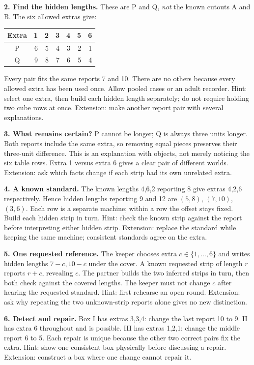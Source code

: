 \documentclass[letterpaper,11pt]{article}
\begin{document}
\textbf{2. Find the hidden lengths.} These are P and Q, \emph{not} the known cutouts A and B. The six allowed extras give:
\begin{center}\begin{tabular}{c|rrrrrr}
Extra&1&2&3&4&5&6\\\hline
P&6&5&4&3&2&1\\
Q&9&8&7&6&5&4
\end{tabular}\end{center}
Every pair fits the same reports 7 and 10. There are no others because every allowed extra has been used once. Allow pooled cases or an adult recorder. Hint: select one extra, then build each hidden length separately; do not require holding two cube rows at once. Extension: make another report pair with several explanations.

\textbf{3. What remains certain?} P cannot be longer; Q is always three units longer. Both reports include the same extra, so removing equal pieces preserves their three-unit difference. This is an explanation with objects, not merely noticing the six table rows. Extra 1 versus extra 6 gives a clear pair of different worlds. Extension: ask which facts change if each strip had its own unrelated extra.

\textbf{4. A known standard.} The known lengths 4,6,2 reporting 8 give extras 4,2,6 respectively. Hence hidden lengths reporting 9 and 12 are $(5,8)$, $(7,10)$, $(3,6)$. Each row is a separate machine; within a row the offset stays fixed. Build each hidden strip in turn. Hint: check the known strip against the report before interpreting either hidden strip. Extension: replace the standard while keeping the same machine; consistent standards agree on the extra.

\textbf{5. One requested reference.} The keeper chooses extra $c\in\{1,\ldots,6\}$ and writes hidden lengths $7-c,10-c$ under the cover. A known requested strip of length $r$ reports $r+c$, revealing $c$. The partner builds the two inferred strips in turn, then both check against the covered lengths. The keeper must not change $c$ after hearing the requested standard. Hint: first rehearse an open round. Extension: ask why repeating the two unknown-strip reports alone gives no new distinction.

\textbf{6. Detect and repair.} Box I has extras 3,3,4: change the last report 10 to 9. II has extra 6 throughout and is possible. III has extras 1,2,1: change the middle report 6 to 5. Each repair is unique because the other two correct pairs fix the extra. Hint: show one consistent box physically before discussing a repair. Extension: construct a box where one change cannot repair it.
\end{document}
